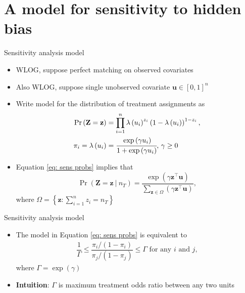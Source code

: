\documentclass[table, xcolor={dvipsnames}, 9pt]{beamer}
\newcommand\given[1][]{\:#1\vert\:}
\theoremstyle{newstyle}
\begin{document}
\section{A model for sensitivity to hidden bias}
\begin{frame}{Sensitivity analysis model}
\vfill
\begin{itemize}
\item WLOG, suppose perfect matching on observed covariates
\item Also WLOG, suppose single unobserved covariate $\bm{u} \in [0, 1]^n$ \\ \citep[][p. 300, footnote 33]{rosenbaum2017}  \vfill
\item Write model for the distribution of treatment assignments as  \vfill
\begin{align} 
\Pr\left(\mathbf{Z} = \mathbf{z}\right) & = \prod \limits_{i = 1}^n \lambda\left(u_i\right)^{z_i} \left(1 - \lambda\left(u_i\right)\right)^{1 - z_i}, \\
\pi_i = \lambda\left(u_i\right) & = \cfrac{\exp\left(\gamma u_i\right)}{1 + \exp\left(\gamma u_i\right)}, \, \gamma \geq 0 \label{eq: sens probs}
\end{align} \vfill
\item  Equation \eqref{eq: sens probs} implies that \vfill
\begin{equation}
\Pr\left(\bm{Z} = \bm{z} \given n_T\right) = \dfrac{\exp\left(\gamma \bm{z}^{\top} \bm{u}\right)}{\sum \limits_{\bm{z} \in \Omega} (\gamma \bm{z}^{\top} \bm{u})},
\end{equation} \vfill
where $\Omega = \left\{\bm{z}: \sum \limits_{i = 1}^n z_i = n_T\right\}$
\end{itemize}
\end{frame}
\begin{frame}{Sensitivity analysis model}
\vfill
\begin{itemize} \vfill
\item The model in Equation \eqref{eq: sens probs} is equivalent to \vfill
\begin{align*}
\dfrac{1}{\Gamma} \leq \dfrac{\pi_i / (1 - \pi_i)}{\pi_j / (1 - \pi_j)} \leq \Gamma \text{ for any } i \text{ and } j,
\end{align*} \vfill
where $\Gamma = \exp(\gamma)$ \citep[see][]{rosenbaum1995} \vfill
\item \textbf{Intuition}: $\Gamma$ is maximum treatment odds ratio between any two units \vfill
\end{itemize}
\end{frame}
\end{document}
